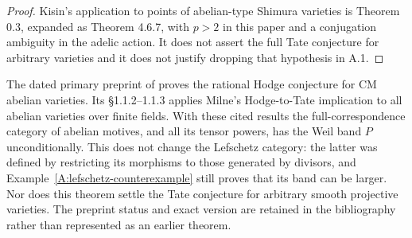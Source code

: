 \begin{proof}
Kisin's application to points of abelian-type Shimura varieties
is Theorem 0.3, expanded as Theorem 4.6.7, with $p>2$ in this
paper and a conjugation ambiguity in the adelic action. It
does not assert the full Tate conjecture for arbitrary varieties
and it does not justify dropping that hypothesis in A.1.
\end{proof}

\begin{remark}
\label{A:2026-abelian}
The dated primary preprint of \citet[Theorem I]{AvanHoftenSempliner2026}
proves the rational Hodge conjecture for CM abelian varieties.
Its \S1.1.2--1.1.3 applies Milne's Hodge-to-Tate implication
to all abelian varieties over finite fields. With these cited
results the full-correspondence category of abelian motives,
and all its tensor powers, has the Weil band $P$
unconditionally. This does not change the Lefschetz category:
the latter was defined by restricting its morphisms to those
generated by divisors, and Example~\ref{A:lefschetz-counterexample}
still proves that its band can be larger. Nor does this theorem
settle the Tate conjecture for arbitrary smooth projective
varieties. The preprint status and exact version are retained in
the bibliography rather than represented as an earlier theorem.
\end{remark}
